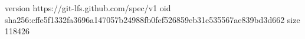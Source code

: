 version https://git-lfs.github.com/spec/v1
oid sha256:cffe5f1332fa3696a147057b24988fb0fef526859eb31c535567ae839bd3d662
size 118426
